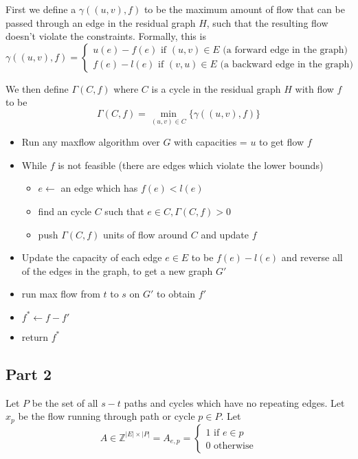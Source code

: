 \documentclass[a4paper]{article}
\begin{document}
First we define a $\gamma((u,v), f)$ to be the maximum amount of flow that can be passed through
an edge in the residual graph $H$, such that the resulting flow doesn't violate the constraints. Formally, this is 
$$
\gamma((u,v), f) = \begin{cases}
	u(e) - f(e) \text{  if  } (u,v) \in E \text{ (a forward edge in the graph)}\\
	f(e) - l(e) \text{  if  } (v,u) \in E \text{ (a backward edge in the graph)}
\end{cases}
$$

We then define $\Gamma(C, f)$ where $C$ is a cycle in the residual graph $H$ with flow $f$ to be 
$$
\Gamma(C, f) = \min_{(u,v) \in C}\{\gamma((u,v), f)\}
$$


\begin{itemize}
	\item Run any maxflow algorithm over $G$ with capacities = $u$ to get flow $f$
	\item While $f$ is not feasible (there are edges which violate the lower bounds)
	\begin{itemize}
		\item $e \gets $ an edge which has $f(e) < l(e)$
		\item find an cycle $C$ such that $e \in C, \Gamma(C, f) > 0$
		\item push $\Gamma(C, f)$ units of flow around $C$ and update $f$
	\end{itemize}
	\item Update the capacity of each edge $e \in E$ to be $f(e) - l(e)$ and reverse all of the edges in the graph, to get a new graph $G'$
	\item run max flow from $t$ to $s$ on $G'$ to obtain $f'$
	\item $f^* \gets f - f'$
	\item return $f^*$
\end{itemize}
\subsection{Part 2}

Let $P$ be the set of all $s-t$ paths and cycles which have no repeating edges.
Let $x_p$ be the flow running through path or cycle $p \in P$.
Let $$
A \in \mathds{Z}^{ |E| \times |P| } = A_{e,p} = \begin{cases} 1 \text{  if  } e \in p\\ 0 \text{  otherwise}\end{cases}
$$
\end{document}
